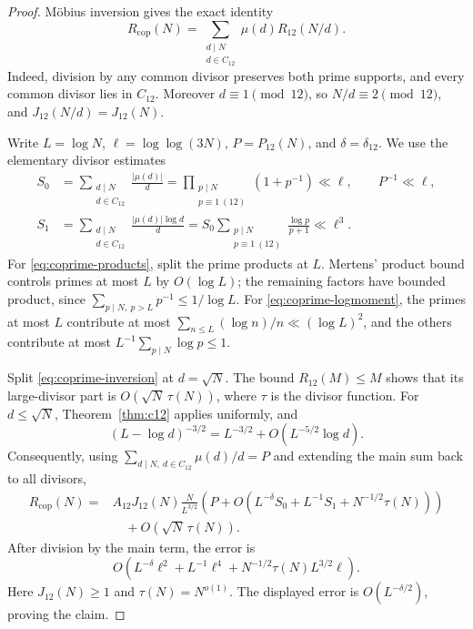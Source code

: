 \begin{proof}
M\"obius inversion gives the exact identity
\begin{equation}\label{eq:coprime-inversion}
 R_{\mathrm{cop}}(N)
 =\sum_{\substack{d\mid N\\d\in C_{12}}}\mu(d)R_{12}(N/d).
\end{equation}
Indeed, division by any common divisor preserves both prime supports,
and every common divisor lies in \(C_{12}\). Moreover \(d\equiv1\pmod{12}\),
so \(N/d\equiv2\pmod{12}\), and
\(J_{12}(N/d)=J_{12}(N)\).

Write \(L=\log N\), \(\ell=\log\log(3N)\),
\(P=P_{12}(N)\), and \(\delta=\delta_{12}\).
We use the elementary divisor estimates
\begin{align}
 S_0&=\sum_{\substack{d\mid N\\d\in C_{12}}}\frac{|\mu(d)|}{d}
       =\prod_{\substack{p\mid N\\p\equiv1\ (12)}}(1+p^{-1})
       \ll\ell,\qquad P^{-1}\ll\ell,\label{eq:coprime-products}\\
 S_1&=\sum_{\substack{d\mid N\\d\in C_{12}}}
                          \frac{|\mu(d)|\log d}{d}
       =S_0\sum_{\substack{p\mid N\\p\equiv1\ (12)}}
                                     \frac{\log p}{p+1}
       \ll\ell^3.\label{eq:coprime-logmoment}
\end{align}
For \eqref{eq:coprime-products}, split the prime products at \(L\).
Mertens' product bound controls primes at most \(L\) by \(O(\log L)\);
the remaining factors have bounded product, since
\(\sum_{p\mid N,\ p>L}p^{-1}\le1/\log L\).
For \eqref{eq:coprime-logmoment}, the primes at most \(L\) contribute
at most \(\sum_{n\le L}(\log n)/n\ll(\log L)^2\), and the others
contribute at most \(L^{-1}\sum_{p\mid N}\log p\le1\).

Split \eqref{eq:coprime-inversion} at \(d=\sqrt N\).
The bound \(R_{12}(M)\le M\) shows that its large-divisor part is
\(O(\sqrt N\,\tau(N))\), where \(\tau\) is the divisor function.
For \(d\le\sqrt N\), Theorem~\ref{thm:c12} applies uniformly, and
\[
 (L-\log d)^{-3/2}
       =L^{-3/2}+O(L^{-5/2}\log d).
\]
Consequently, using \(\sum_{d\mid N,\ d\in C_{12}}\mu(d)/d=P\)
and extending the main sum back to all divisors,
\begin{align*}
 R_{\mathrm{cop}}(N)
 ={}&A_{12}J_{12}(N)\frac{N}{L^{3/2}}
       \left(P+O(L^{-\delta}S_0+L^{-1}S_1
                            +N^{-1/2}\tau(N))\right)\\
 &\quad+O(\sqrt N\,\tau(N)).
\end{align*}
After division by the main term, the error is
\[
 O\!\left(L^{-\delta}\ell^2+L^{-1}\ell^4
                  +N^{-1/2}\tau(N)L^{3/2}\ell\right).
\]
Here \(J_{12}(N)\ge1\) and \(\tau(N)=N^{o(1)}\).
The displayed error is \(O(L^{-\delta/2})\), proving the claim.
\end{proof}

